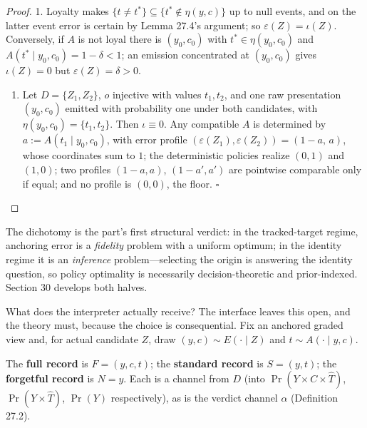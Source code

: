 \begin{proof}

1. Loyalty makes \(\{t \ne t^*\} \subseteq \{t^* \notin \eta(y,c)\}\) up to null events, and on the latter event error is certain by Lemma 27.4's argument; so \(\varepsilon(Z) = \iota(Z)\). Conversely, if \(A\) is not loyal there is \((y_0, c_0)\) with \(t^* \in \eta(y_0, c_0)\) and \(A(t^* \mid y_0, c_0) = 1 - \delta < 1\); an emission concentrated at \((y_0, c_0)\) gives \(\iota(Z) = 0\) but \(\varepsilon(Z) = \delta > 0\).

\begin{enumerate}
\def\labelenumi{\arabic{enumi}.}
\setcounter{enumi}{1}
\tightlist
\item
  Let \(D = \{Z_1, Z_2\}\), \(o\) injective with values \(t_1, t_2\), and one raw presentation \((y_0, c_0)\) emitted with probability one under both candidates, with \(\eta(y_0, c_0) = \{t_1, t_2\}\). Then \(\iota \equiv 0\). Any compatible \(A\) is determined by \(a := A(t_1 \mid y_0, c_0)\), with error profile \((\varepsilon(Z_1), \varepsilon(Z_2)) = (1 - a,\, a)\), whose coordinates sum to \(1\); the deterministic policies realize \((0,1)\) and \((1,0)\); two profiles \((1-a, a)\), \((1-a', a')\) are pointwise comparable only if equal; and no profile is \((0,0)\), the floor. \(\square\)
\end{enumerate}
\end{proof}

The dichotomy is the part's first structural verdict: in the tracked-target regime, anchoring error is a \emph{fidelity} problem with a uniform optimum; in the identity regime it is an \emph{inference} problem---\hspace{0pt}selecting the origin is answering the identity question, so policy optimality is necessarily decision-theoretic and prior-indexed. Section 30 develops both halves.


What does the interpreter actually receive? The interface leaves this open, and the theory must, because the choice is consequential. Fix an anchored graded view and, for actual candidate \(Z\), draw \((y, c) \sim E(\cdot \mid Z)\) and \(t \sim A(\cdot \mid y, c)\).

\begin{thmdef}

The \textbf{full record} is \(F = (y, c, t)\); the \textbf{standard record} is \(S = (y, t)\); the \textbf{forgetful record} is \(N = y\). Each is a channel from \(D\) (into \(\Pr(Y \times C \times \widehat{T})\), \(\Pr(Y \times \widehat{T})\), \(\Pr(Y)\) respectively), as is the verdict channel \(\alpha\) (Definition 27.2).
\end{thmdef}

